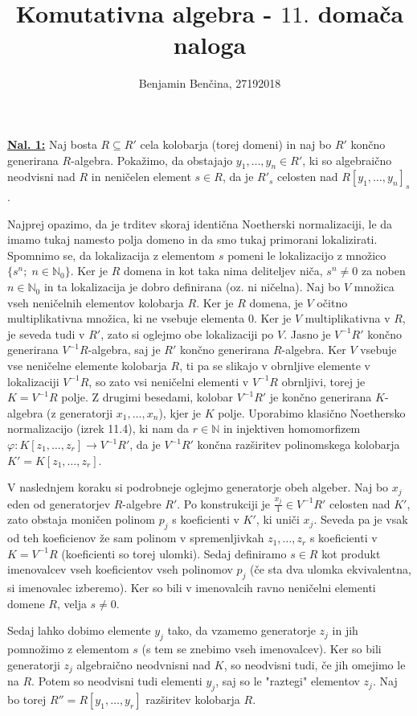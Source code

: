 \documentclass[a4paper, 12pt]{article}
\title{Komutativna algebra - $11.$ domača naloga}
\author{Benjamin Benčina, 27192018}
\newcommand{\N}{\mathbb{N}}
\begin{document}
\maketitle

\underline{\textbf{Nal. 1:}}
Naj bosta $R \subseteq R'$ cela kolobarja (torej domeni) in naj bo $R'$ končno generirana $R$-algebra. Pokažimo, da obstajajo $y_1, \dots, y_n \in R'$, ki so algebraično neodvisni nad $R$ in neničelen element $s \in R$, da je $R'_s$ celosten nad $R[y_1,\dots,y_n]_s$.

Najprej opazimo, da je trditev skoraj identična Noetherski normalizaciji, le da imamo tukaj namesto polja domeno in da smo tukaj primorani lokalizirati. Spomnimo se, da lokalizacija z elementom $s$ pomeni le lokalizacijo z množico $\lbrace s^n ; \; n \in \N_0\rbrace$. Ker je $R$ domena in kot taka nima deliteljev niča, $s^n \neq 0$ za noben $n \in \N_0$ in ta lokalizacija je dobro definirana (oz. ni ničelna).
Naj bo $V$ množica vseh neničelnih elementov kolobarja $R$. Ker je $R$ domena, je $V$ očitno multiplikativna množica, ki ne vsebuje elementa $0$. Ker je $V$ multiplikativna v $R$, je seveda tudi v $R'$, zato si oglejmo obe lokalizaciji po $V$. Jasno je $V^{-1}R'$ končno generirana $V^{-1}R$-algebra, saj je $R'$ končno generirana $R$-algebra. Ker $V$ vsebuje vse neničelne elemente kolobarja $R$, ti pa se slikajo v obrnljive elemente v lokalizaciji $V^{-1}R$, so zato vsi neničelni elementi v $V^{-1}R$ obrnljivi, torej je $K = V^{-1}R$ polje. Z drugimi besedami, kolobar $V^{-1}R'$ je končno generirana $K$-algebra (z generatorji $x_1,\dots, x_n$), kjer je $K$ polje. Uporabimo klasično Noethersko normalizacijo (izrek 11.4), ki nam da $r \in \N$ in injektiven homomorfizem $\varphi\colon K[z_1, \dots, z_r] \to V^{-1}R'$, da je $V^{-1}R'$ končna razširitev polinomskega kolobarja $K' = K[z_1, \dots, z_r]$.

V naslednjem koraku si podrobneje oglejmo generatorje obeh algeber. Naj bo $x_j$ eden od generatorjev $R$-algebre $R'$. Po konstrukciji je $\frac{x_j}{1} \in V^{-1}R'$ celosten nad $K'$, zato obstaja moničen polinom $p_j$ s koeficienti v $K'$, ki uniči $x_j$. Seveda pa je vsak od teh koeficienov že sam polinom v spremenljivkah $z_1,\dots, z_r$ s koeficienti v $K = V^{-1}R$ (koeficienti so torej ulomki). Sedaj definiramo $s \in R$ kot produkt imenovalcev vseh koeficientov vseh polinomov $p_j$ (če sta dva ulomka ekvivalentna, si imenovalec izberemo). Ker so bili v imenovalcih ravno neničelni elementi domene $R$, velja $s \neq 0$.

Sedaj lahko dobimo elemente $y_j$ tako, da vzamemo generatorje $z_j$ in jih pomnožimo z elementom $s$ (s tem se znebimo vseh imenovalcev). Ker so bili generatorji $z_j$ algebraično neodvnisni nad $K$, so neodvisni tudi, če jih omejimo le na $R$. Potem so neodvisni tudi elementi $y_j$, saj so le "raztegi" elementov $z_j$. Naj bo torej $R'' = R[y_1,\dots,y_r]$ razširitev kolobarja $R$.
\end{document}
